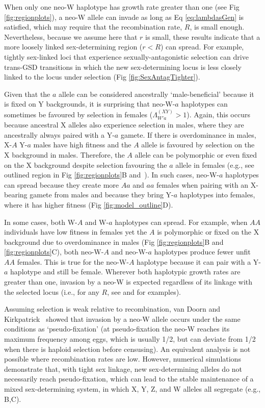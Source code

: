 \documentclass[10pt,letterpaper]{article}
\begin{document}

When only one neo-W haplotype has growth rate greater than one (see Fig \ref{fig:regionplots}), a neo-W allele can invade as long as Eq \eqref{eq:lambdasGen} is satisfied, which may require that the recombination rate, $R$, is small enough.
Nevertheless, because we assume here that $r$ is small, these results indicate that a more loosely linked sex-determining region ($r<R$) can spread.
For example, tightly sex-linked loci that experience sexually-antagonistic selection can drive trans-GSD transitions in which the new sex-determining locus is less closely linked to the locus under selection (Fig \ref{fig:SexAntagTighter}). 

Given that the $a$ allele can be considered ancestrally `male-beneficial' because it is fixed on Y backgrounds, it is surprising that neo-W-$a$ haplotypes can sometimes be favoured by selection in females ($\Lambda_{W'a}^{(XY)}>1$). 
Again, this occurs because ancestral X alleles also experience selection in males, where they are ancestrally always paired with a Y-$a$ gamete. 
If there is overdominance in males, X-$A$ Y-$a$ males have high fitness and the $A$ allele is favoured by selection on the X background in males. 
Therefore, the $A$ allele can be polymorphic or even fixed on the X background despite selection favouring the $a$ allele in females (e.g., see outlined region in Fig \ref{fig:regionplots}B and~\cite{Lloyd1977,Otto2014}). 
In such cases, neo-W-$a$ haplotypes can spread because they create more $Aa$ and $aa$ females when pairing with an X-bearing gamete from males and because they bring Y-$a$ haplotypes into females, where it has higher fitness (Fig \ref{fig:model_outline}D). 

In some cases, both W-$A$ and W-$a$ haplotypes can spread.
For example, when $AA$ individuals have low fitness in females yet the $A$ is polymorphic or fixed on the X background due to overdominance in males (Fig \ref{fig:regionplots}B and \ref{fig:regionplots}C), both neo-W-$A$ and neo-W-$a$ haplotypes produce fewer unfit $AA$ females.
This is true for the neo-W-$A$ haplotype because it can pair with a Y-$a$ haplotype and still be female. 
Wherever both haplotypic growth rates are greater than one, invasion by a neo-W is expected regardless of its linkage with the selected locus (i.e., for any $R$, see  and  for examples). 

Assuming selection is weak relative to recombination, van Doorn and Kirkpatrick~\cite{vanDoorn:2010hu} showed that invasion by a neo-W allele occurs under the same conditions as `pseudo-fixation' (at pseudo-fixation the neo-W reaches its maximum frequency among eggs, which is usually 1/2, but can deviate from 1/2 when there is haploid selection before censusing). 
An equivalent analysis is not possible where recombination rates are low. 
However, numerical simulations demonstrate that, with tight sex linkage, new sex-determining alleles do not necessarily reach pseudo-fixation, which can lead to the stable maintenance of a mixed sex-determining system, in which X, Y, Z, and W alleles all segregate (e.g., B,C). 
\end{document}
